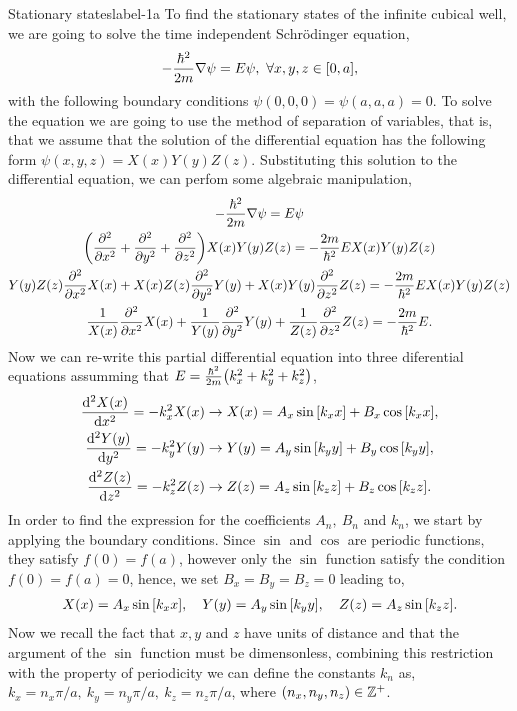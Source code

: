 \documentclass[../main.tex]{subfiles}
\begin{document}
\begin{sol}{Stationary states}{label-1a}
    To find the stationary states of the infinite cubical well, we are going to solve the time independent Schrödinger equation,
    \begin{gather*}
        -\frac{\hbar^2}{2m}\nabla\psi=E\psi,~\forall x,y,z \in \qty[0,a],
    \end{gather*}
    with the following boundary conditions $\psi(0,0,0)=\psi(a,a,a)=0$.
    To solve the equation we are going to use the method of separation of variables, that is, that we assume that the solution of the differential equation has the following form $\psi(x,y,z)=X(x)Y(y)Z(z)$.
    Substituting this solution to the differential equation, we can perfom some algebraic manipulation,
    \begin{gather*}
        -\frac{\hbar^2}{2m}\nabla\psi =E\psi \\
        \qty(\pdv[2]{x}+\pdv[2]{y}+\pdv[2]{z})X(x)Y(y)Z(z) = -\frac{2m}{\hbar^2}EX(x)Y(y)Z(z) \\
        Y(y)Z(z)\pdv[2]{x}X(x)+X(x)Z(z)\pdv[2]{y}Y(y)+X(x)Y(y)\pdv[2]{z}Z(z) = -\frac{2m}{\hbar^2}EX(x)Y(y)Z(z) \\
        \frac{1}{X(x)}\pdv[2]{x}X(x)+\frac{1}{Y(y)}\pdv[2]{y}Y(y)+\frac{1}{Z(z)}\pdv[2]{z}Z(z)= -\frac{2m}{\hbar^2}E.
    \end{gather*}
    Now we can re-write this partial differential equation into three diferential equations assumming that $E=\frac{\hbar^2}{2m}\qty(k_x^2+k_y^2+k_z^2)$,
    \begin{align*}
        \dv[2]{X(x)}{x} = -k_x^2X(x) &\rightarrow X(x)=A_x\sin\qty[k_x x]+B_x\cos\qty[k_x x],\\
        \dv[2]{Y(y)}{y} = -k_y^2Y(y) &\rightarrow Y(y)=A_y\sin\qty[k_y y]+B_y\cos\qty[k_y y],\\
        \dv[2]{Z(z)}{z} = -k_z^2Z(z) &\rightarrow Z(z)=A_z\sin\qty[k_z z]+B_z\cos\qty[k_z z].
    \end{align*}
    In order to find the expression for the coefficients $A_n,~B_n$ and $k_n$, we start by applying the boundary conditions.
    Since $\sin$ and $\cos$ are periodic functions, they satisfy $f(0)=f(a)$, however only the $\sin$ function satisfy the condition $f(0)=f(a)=0$, hence, we set $B_x=B_y=B_z=0$ leading to,
     \begin{gather*}
        X(x)=A_x\sin\qty[k_x x],\quad Y(y)=A_y\sin\qty[k_y y],\quad Z(z)=A_z\sin\qty[k_z z].
    \end{gather*}
    Now we recall the fact that $x,y$ and $z$ have units of distance and that the argument of the $\sin$ function must be dimensonless, combining this restriction with the property of periodicity we can define the constants $k_n$ as, $k_x=n_x\pi/a,~k_y=n_y\pi/a,~k_z=n_z\pi/a$, where $\qty(n_x,n_y,n_z)\in\mathbb{Z}^+$.

\end{sol}
\end{document}
